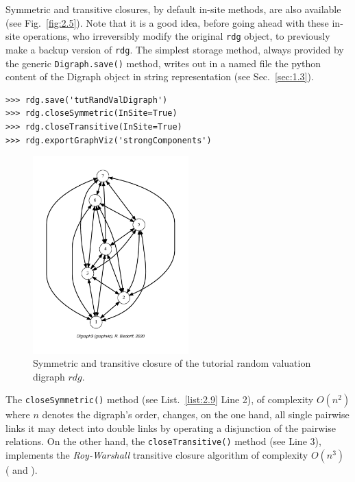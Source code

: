 Symmetric and transitive closures, by default in-site methods, are also available (see Fig.~\vref{fig:2.5}). Note that it is a good idea, before going ahead with these in-site operations, who irreversibly modify the original \texttt{rdg} object, to previously make a backup version of \texttt{rdg}. The simplest storage method, always provided by the generic \texttt{Digraph.save()} method, writes out in a named file the python content of the Digraph object in string representation (see Sec.~\vref{sec:1.3}).
\begin{lstlisting}[caption={Symmeric and transitive closures},label=list:2.9]
>>> rdg.save('tutRandValDigraph')
>>> rdg.closeSymmetric(InSite=True)
>>> rdg.closeTransitive(InSite=True)
>>> rdg.exportGraphViz('strongComponents')
\end{lstlisting}
\begin{figure}[h]
\sidecaption[t]
\includegraphics[width=6cm]{Figures/2-5-strongComponents.pdf}
\caption{Symmetric and transitive closure of the tutorial random valuation digraph $rdg$.}
\label{fig:2.5}       %
\end{figure}

The \texttt{closeSymmetric()} method (see List.~\vref{list:2.9} Line 2), of complexity $O(n^2)$ where $n$ denotes the digraph's order, changes, on the one hand, all single pairwise links it may detect into double links by operating a disjunction of the pairwise relations. On the other hand, the \texttt{closeTransitive()}  method (see Line 3), implements the \emph{Roy-Warshall} transitive closure algorithm of complexity $O(n^3)$   (\citealp{ROY-1959} and \citealp{WAR-1962}).

